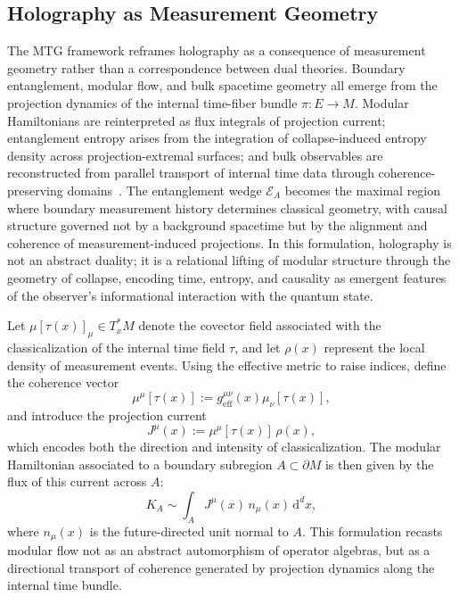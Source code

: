 \documentclass[11pt]{article}
\begin{document}
\subsection{Holography as Measurement Geometry}
The MTG framework reframes holography as a consequence of measurement geometry rather than a correspondence between dual theories. Boundary entanglement, modular flow, and bulk spacetime geometry all emerge from the projection dynamics of the internal time-fiber bundle \( \pi: E \to M \). Modular Hamiltonians are reinterpreted as flux integrals of projection current; entanglement entropy arises from the integration of collapse-induced entropy density across projection-extremal surfaces; and bulk observables are reconstructed from parallel transport of internal time data through coherence-preserving domains~\cite{hamilton2006local}. The entanglement wedge \( \mathcal{E}_A \) becomes the maximal region where boundary measurement history determines classical geometry, with causal structure governed not by a background spacetime but by the alignment and coherence of measurement-induced projections. In this formulation, holography is not an abstract duality; it is a relational lifting of modular structure through the geometry of collapse, encoding time, entropy, and causality as emergent features of the observer's informational interaction with the quantum state.

Let \( \mu[\tau(x)]_\mu \in T^*_x M \) denote the covector field associated with the classicalization of the internal time field \( \tau \), and let \( \rho(x) \) represent the local density of measurement events. Using the effective metric to raise indices, define the coherence vector
\begin{equation}
\mu^\mu[\tau(x)] := g^{\mu\nu}_{\mathrm{eff}}(x) \mu_\nu[\tau(x)],
\end{equation}
and introduce the projection current
\begin{equation}
J^\mu(x) := \mu^\mu[\tau(x)] \, \rho(x),
\end{equation}
which encodes both the direction and intensity of classicalization. The modular Hamiltonian associated to a boundary subregion \( A \subset \partial M \) is then given by the flux of this current across \( A \):
\begin{equation}
K_A \sim \int_A J^\mu(x) \, n_\mu(x) \, \mathrm{d}^d x,
\end{equation}
where \( n_\mu(x) \) is the future-directed unit normal to \( A \). This formulation recasts modular flow not as an abstract automorphism of operator algebras, but as a directional transport of coherence generated by projection dynamics along the internal time bundle.
\end{document}
